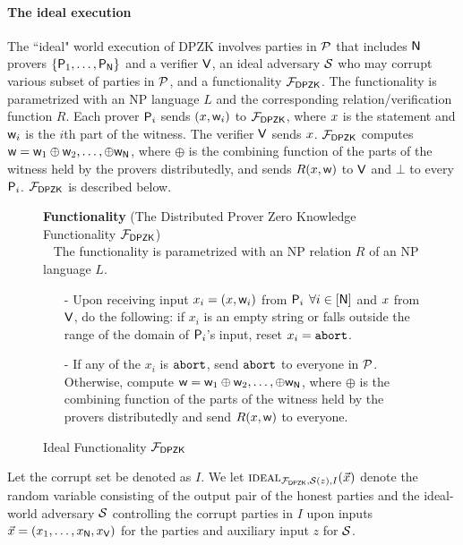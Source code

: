 \paragraph{The ideal execution} The ``ideal" world execution of DPZK  involves parties in $\mathcal{P}$ that includes $\mathsf{N}$ provers $\{\mathsf{P}_1, \ldots, \mathsf{P}_{\mathsf{N}}\}$ and a verifier $\mathsf{V}$,  an ideal adversary $\mathcal{S}$ who may corrupt various subset of parties in $\mathcal{P}$, and a  functionality $\mathcal{F}_{\mathsf{DPZK}}$.  The functionality is parametrized with an  NP language $L$ and  the corresponding relation/verification function $R$. Each prover $\mathsf{P}_i$ sends $({x},\mathsf{w}_i)$ to $\mathcal{F}_{\mathsf{DPZK}}$, where ${x}$ is the statement and $\mathsf{w}_i$ is the $i$th part of the witness. The verifier $\mathsf{V}$ sends ${x}$.  $\mathcal{F}_{\mathsf{DPZK}}$ computes $\mathsf{w} = \mathsf{w}_1 \oplus \mathsf{w}_2,\ldots,\oplus \mathsf{w}_{\mathsf{N}}$, where $\oplus$ is the combining function of the parts of the witness held by the provers distributedly, and sends $R({x},\mathsf{w})$ to $\mathsf{V}$ and $\bot$ to every $\mathsf{P}_i$. $\mathcal{F}_{\mathsf{DPZK}}$  is described below. 
\begin{figure}[H]
	\centering
	\begin{framed}
		\textbf{Functionality} (The Distributed Prover Zero Knowledge Functionality $\mathcal{F}_{\mathsf{DPZK}}$)\\~
		The functionality is parametrized with an NP relation $R$ of an NP language $L$.
		\begin{itemize}
		\item[-] Upon receiving input $x_i = ({x}, \mathsf{w}_i)$ from $\mathsf{P}_i$ $\forall i\in[\mathsf{N}]$ and ${x}$ from $\mathsf{V}$, do the following: if $x_i$ is an empty string or falls outside the range of the domain of $\mathsf{P}_i$'s input,  reset $x_i = \texttt{abort}$. 
			\item[-] If any of the $x_i$ is $\texttt{abort}$, send $\texttt{abort}$ to everyone in $\mathcal{P}$. Otherwise,   compute $\mathsf{w} = \mathsf{w}_1 \oplus \mathsf{w}_2,\ldots, \oplus \mathsf{w}_{\mathsf{N}}$, where $\oplus$ is the combining function of the parts of the witness held by the provers distributedly and send $R({x}, \mathsf{w})$ to everyone. 
		\end{itemize}
	\end{framed}
	\caption{Ideal Functionality $\mathcal{F}_{\mathsf{DPZK}}$}
\end{figure} \label{func:DPZK}

Let the corrupt set be denoted as $I$. We let $\textsc{ideal}_{\mathcal{F}_{\mathsf{DPZK}}, \mathcal{S}(z),I}(\vec{x})$ denote the random variable consisting of the output pair of the honest parties and the ideal-world adversary $\mathcal{S}$ controlling the corrupt parties in $I$ upon inputs $\vec{x} = (x_1  ,\ldots,x_{\mathsf{N}},x_{\mathsf{V}})$ for the parties and auxiliary input $z$ for $\mathcal{S}$.  


